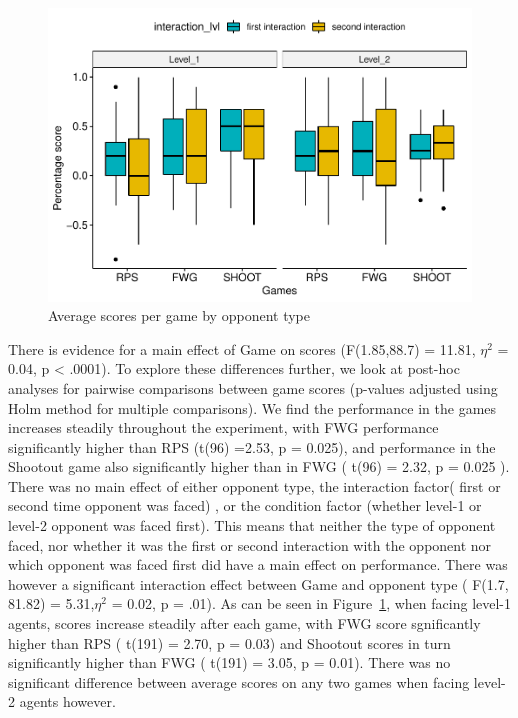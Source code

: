 \documentclass[man,floatsintext]{apa6}
\begin{document}
\begin{figure}

{\centering \includegraphics{draft_report_v1_files/figure-latex/exp2-score-by-opp-1} 

}

\caption{Average scores per game by opponent type}\label{fig:exp2-score-by-opp}
\end{figure}

There is evidence for a main effect of Game on scores (F(1.85,88.7) = 11.81, \(\eta^{2}\) = 0.04, p \textless{} .0001). To explore these differences further, we look at post-hoc analyses for pairwise comparisons between game scores (p-values adjusted using Holm method for multiple comparisons). We find the performance in the games increases steadily throughout the experiment, with FWG performance significantly higher than RPS (t(96) =2.53, p = 0.025), and performance in the Shootout game also significantly higher than in FWG ( t(96) = 2.32, p = 0.025 ). There was no main effect of either opponent type, the interaction factor( first or second time opponent was faced) , or the condition factor (whether level-1 or level-2 opponent was faced first). This means that neither the type of opponent faced, nor whether it was the first or second interaction with the opponent nor which opponent was faced first did have a main effect on performance. There was however a significant interaction effect between Game and opponent type ( F(1.7, 81.82) = 5.31,\(\eta^{2}\) = 0.02, p = .01). As can be seen in Figure~\ref{fig:exp2-score-by-opp}, when facing level-1 agents, scores increase steadily after each game, with FWG score sgnificantly higher than RPS ( t(191) = 2.70, p = 0.03) and Shootout scores in turn significantly higher than FWG ( t(191) = 3.05, p = 0.01). There was no significant difference between average scores on any two games when facing level-2 agents however.
\end{document}
